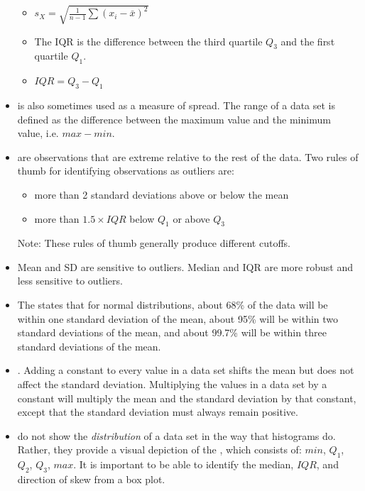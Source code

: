 \begin{itemize}
\begin{itemize}
\item[]   $s_{\scriptscriptstyle{X}}
 = \sqrt{\frac{1}{n-1} \sum{(x_i -  \bar{x})^2}}$ 

\item The IQR is the difference between the third quartile $Q_3$ and the first quartile $Q_1$.

\item[] $IQR = Q_3 - Q_1$ 
\end{itemize}


\item {} is also sometimes used as a measure of spread.  The range of a data set is defined as the difference between the maximum value and the minimum value, i.e. $max - min$.

\item {} are observations that are extreme relative to the rest of the data.  Two rules of thumb for identifying observations as outliers are:
\begin{itemize}\vspace{-1mm}
\setlength{\itemsep}{0mm}
\item more than 2 standard deviations above or below the mean
\item more than $1.5 \times IQR$ below $Q_1$ or above $Q_3$
\end{itemize}
Note: These rules of thumb generally produce different cutoffs.
\item Mean and SD are sensitive to outliers.  Median and IQR are more robust and less sensitive to outliers.

\item The  states that for normal distributions, about 68\% of the data will be within one standard deviation of the mean, about 95\% will be within two standard deviations of the mean, and about 99.7\% will be within three standard deviations of the mean.
\item {}.  Adding a constant to every value in a data set shifts the mean but does not affect the standard deviation. Multiplying the values in a data set by a constant will multiply the mean and the standard deviation by that constant, except that the standard deviation must always remain positive. 

\item {} do not show the \textit{distribution} of a data set in the way that histograms do.
Rather, they provide a visual depiction of the , which consists of: $min$, $Q_1$, $Q_2$, $Q_3$, $max$.
It is important to be able to identify the median, $IQR$, and direction of skew from a box plot.  


\end{itemize}


